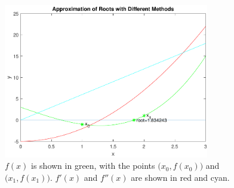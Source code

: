 \documentclass{article}
\begin{document}
\begin{enumerate}
\begin{figure}
  \centering
  \includegraphics[width=0.8\textwidth]{q2plotv}
  \caption{$f(x)$ is shown in green, with the points $\big(x_0,f(x_0)\big)$ and $\big(x_1,f(x_1)\big)$. $f'(x)$ and $f''(x)$ are shown in red and cyan.}
  \label{fig:q2plot}
\end{figure}
\end{enumerate}
\end{document}
